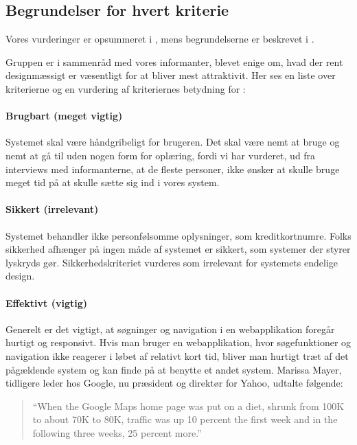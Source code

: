 \subsection{Begrundelser for hvert kriterie}
\label{sec:begrundelsekriterier}

Vores vurderinger er opsummeret i , mens begrundelserne er beskrevet i .



Gruppen er i sammenråd med vores informanter, blevet enige om, hvad der rent designmæssigt er væsentligt for at \Foodl{} bliver mest attraktivit. Her ses en liste over kriterierne og en vurdering af kriteriernes betydning for \Foodl{}:

\paragraph{Brugbart (meget vigtig)} 
Systemet skal være håndgribeligt for brugeren. Det skal være nemt at bruge og nemt at gå til uden nogen form for oplæring, fordi vi har vurderet, ud fra interviews med informanterne, at de fleste personer, ikke ønsker at skulle bruge meget tid på at skulle sætte sig ind i vores system. 

\paragraph{Sikkert (irrelevant)} 
Systemet behandler ikke personfølsomme oplysninger, som \fx kreditkortnumre. Folks sikkerhed afhænger på ingen måde af systemet er sikkert, som \fx systemer der styrer lyskryds gør. Sikkerhedskriteriet vurderes som irrelevant for systemets endelige design.

\paragraph{Effektivt (vigtig)} 
Generelt er det vigtigt, at søgninger og navigation i en webapplikation foregår hurtigt og responsivt. Hvis man bruger en webapplikation, hvor søgefunktioner og navigation ikke reagerer i løbet af relativt kort tid, bliver man hurtigt træt af det pågældende system og kan finde på at benytte et andet system. Marissa Mayer, tidligere leder hos Google, nu præsident og direktør for Yahoo, udtalte følgende: \cite{googlespeed}

\begin{quote}
``When the Google Maps home page was put on a diet, shrunk from 100K to about 70K to 80K, traffic was up 10 percent the first week and in the following three weeks, 25 percent more.''
\end{quote}  

